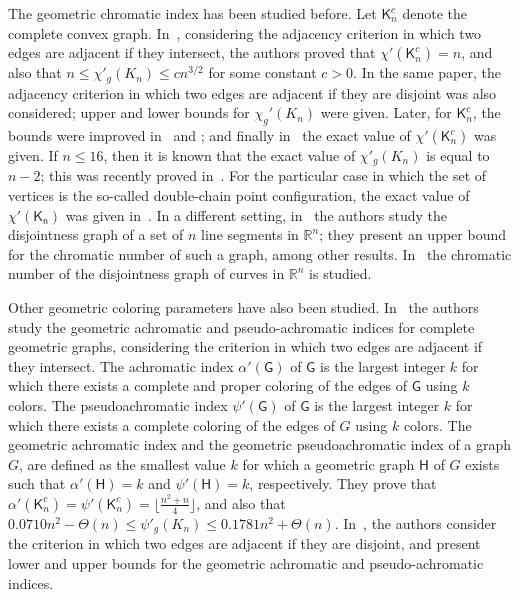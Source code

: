 \documentclass[11pt]{article}
\begin{document}
The geometric chromatic index has been studied before. Let $\mathsf{K}^c_n$ denote the complete convex graph. In~\cite{MR2155418}, considering the adjacency criterion in which two edges are adjacent if they intersect, the authors proved that $\chi'(\mathsf{K}^c_n) = n$, and also that $n \leq \chi'_g(K_n) \leq cn^{3/2}$ for some constant $c > 0$. In the same paper, the adjacency criterion in which two edges are adjacent if they are disjoint was also considered; upper and lower bounds for $\chi_g'(K_n)$ were given. Later, for $\mathsf{K}^c_n$, the bounds were improved in~\cite{MR3862366} and \cite{MR3446120}; and finally in~\cite{jonsson2011exact,FJVW2018exact} the exact value of $\chi'(\mathsf{K}^c_n)$ was given. If $n \leq 16 $, then it is known that the exact value of $\chi'_g(K_n)$ is equal to $n-2$; this was recently proved in~\cite{MR4788271}. For the particular case in which the set of vertices is the so-called double-chain point configuration, the exact value of $\chi'(\mathsf{K_n})$ was given in~\cite{MR4104109}. In a different setting, in~\cite{MR4272849} the authors study the disjointness graph of a set of $n$ line segments in $\mathbb{R}^n$; they present an upper bound for the chromatic number of such a graph, among other results. In~\cite{MR4115538} the chromatic number of the disjointness graph of curves in $\mathbb{R}^n$ is studied.

Other geometric coloring parameters have also been studied. In~\cite{MR3461960} the authors study the geometric achromatic and pseudo-achromatic indices for complete geometric graphs, considering the criterion in which two edges are adjacent if they intersect. The achromatic index $\alpha'(\mathsf{G})$ of $\mathsf{G}$ is the largest integer $k$ for which there exists a complete and proper coloring of the edges of $\mathsf{G}$ using $k$ colors. The pseudoachromatic index $\psi'(\mathsf{G})$ of $\mathsf{G}$ is the largest integer $k$ for which there exists a complete coloring of the edges of $G$ using $k$ colors. The geometric achromatic index and the geometric pseudoachromatic index of a graph $G$, are defined as the smallest value $k$ for which a geometric graph $\mathsf{H}$ of $G$ exists such that $\alpha'(\mathsf{H})=k$ and $\psi'(\mathsf{H})=k$, respectively. They prove that $\alpha'(\mathsf{K}^c_n) = \psi'(\mathsf{K}^c_n)= \lfloor\frac{n^2+n}{4} \rfloor$, and also that
$0.0710 n^2 - \Theta(n) \leq \psi'_g(K_n) \leq 0.1781n^2 + \Theta(n)$. In~\cite{MR4341191}, the authors consider the criterion in which two edges are adjacent if they are disjoint, and present lower and upper bounds for the geometric achromatic and pseudo-achromatic indices.
\end{document}
